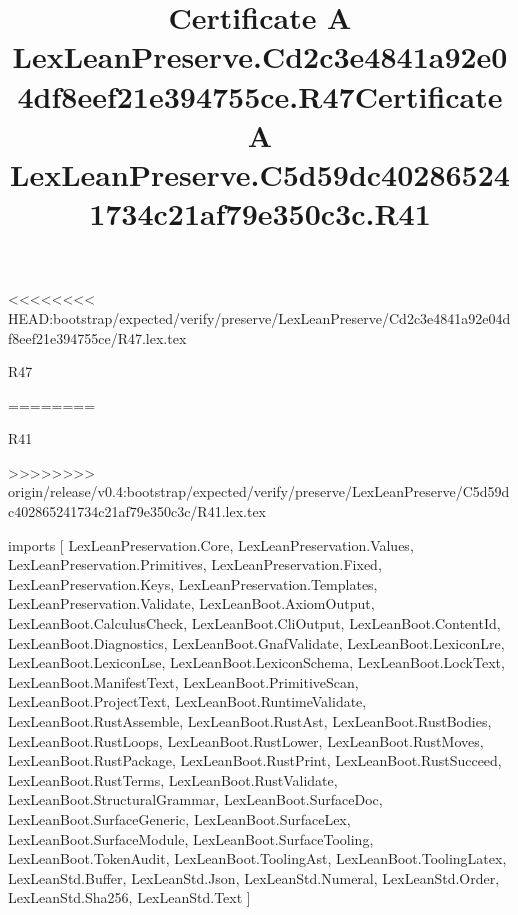 <<<<<<<< HEAD:bootstrap/expected/verify/preserve/LexLeanPreserve/Cd2c3e4841a92e04df8eef21e394755ce/R47.lex.tex
\begin{lexlean}{R47}
\title{Certificate A LexLeanPreserve.Cd2c3e4841a92e04df8eef21e394755ce.R47}
========
\begin{lexlean}{R41}
\title{Certificate A LexLeanPreserve.C5d59dc402865241734c21af79e350c3c.R41}
>>>>>>>> origin/release/v0.4:bootstrap/expected/verify/preserve/LexLeanPreserve/C5d59dc402865241734c21af79e350c3c/R41.lex.tex
\begin{coremodule}
imports [
  LexLeanPreservation.Core,
  LexLeanPreservation.Values,
  LexLeanPreservation.Primitives,
  LexLeanPreservation.Fixed,
  LexLeanPreservation.Keys,
  LexLeanPreservation.Templates,
  LexLeanPreservation.Validate,
  LexLeanBoot.AxiomOutput,
  LexLeanBoot.CalculusCheck,
  LexLeanBoot.CliOutput,
  LexLeanBoot.ContentId,
  LexLeanBoot.Diagnostics,
  LexLeanBoot.GnafValidate,
  LexLeanBoot.LexiconLre,
  LexLeanBoot.LexiconLse,
  LexLeanBoot.LexiconSchema,
  LexLeanBoot.LockText,
  LexLeanBoot.ManifestText,
  LexLeanBoot.PrimitiveScan,
  LexLeanBoot.ProjectText,
  LexLeanBoot.RuntimeValidate,
  LexLeanBoot.RustAssemble,
  LexLeanBoot.RustAst,
  LexLeanBoot.RustBodies,
  LexLeanBoot.RustLoops,
  LexLeanBoot.RustLower,
  LexLeanBoot.RustMoves,
  LexLeanBoot.RustPackage,
  LexLeanBoot.RustPrint,
  LexLeanBoot.RustSucceed,
  LexLeanBoot.RustTerms,
  LexLeanBoot.RustValidate,
  LexLeanBoot.StructuralGrammar,
  LexLeanBoot.SurfaceDoc,
  LexLeanBoot.SurfaceGeneric,
  LexLeanBoot.SurfaceLex,
  LexLeanBoot.SurfaceModule,
  LexLeanBoot.SurfaceTooling,
  LexLeanBoot.TokenAudit,
  LexLeanBoot.ToolingAst,
  LexLeanBoot.ToolingLatex,
  LexLeanStd.Buffer,
  LexLeanStd.Json,
  LexLeanStd.Numeral,
  LexLeanStd.Order,
  LexLeanStd.Sha256,
  LexLeanStd.Text
]


\end{coremodule}
\end{lexlean}
\end{lexlean}

